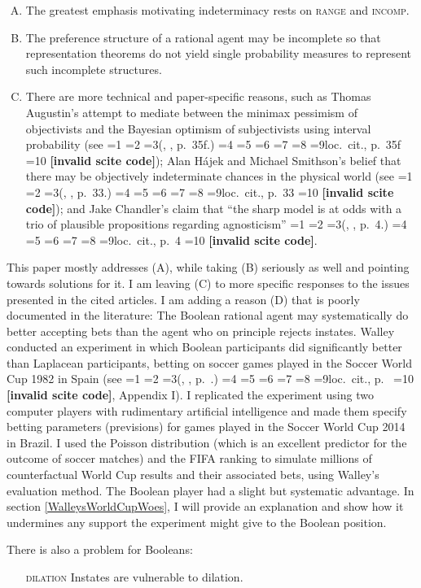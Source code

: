 \documentclass[journal]{IEEEtran}
\newcommand{\qeins}[1]{``#1''}
\newcommand{\fcut}[1]{}
\newif\ifNumericalOrYear
\newcommand{\PageP}{p.~}
\newcommand{\PageP}{}
\newcommand{\scite}[3]{\ifnum#1=1\ifNumericalOrYear\citep{#2}\else\citeyearpar{#2}\fi\else
\ifnum#1=2\ifNumericalOrYear\citep[#3]{#2}\else\citep[{\PageP}#3]{#2}\fi\else
\ifnum#1=3\ifNumericalOrYear(\citet[#3]{#2})\else(\citeauthor{#2}, \citeyear{#2}, {\PageP}#3.)\fi\else
\ifnum#1=4\ifNumericalOrYear\citet{#2}\else\citet{#2}\fi\else
\ifnum#1=5\ifNumericalOrYear(\citet{#2})\else\citep{#2}\fi\else
\ifnum#1=6\ifNumericalOrYear(\citet[#3]{#2})\else\citep[{\PageP}#3]{#2}\fi\else
\ifnum#1=7\ifNumericalOrYear\citep{#2}\else\citealp{#2}\fi\else
\ifnum#1=8\ifNumericalOrYear\citep[#3]{#2}\else\citealp[{\PageP}#3]{#2}\fi\else
\ifnum#1=9\ifNumericalOrYear\citep[#3]{#2}\else{}loc.\ cit., {\PageP}#3\fi\else
\ifnum#1=10\ifNumericalOrYear\citep{#2}\else\citeyear{#2}\fi\else
\textbf{[invalid scite code]}\fi\fi\fi\fi\fi\fi\fi\fi\fi\fi}
\begin{document}
\begin{enumerate}[(A)]
\item The greatest emphasis motivating indeterminacy rests on
  \textsc{range} and \textsc{incomp}.
\item The preference structure of a rational agent may be incomplete
  so that representation theorems do not yield single probability
  measures to represent such incomplete structures.
\item There are more technical and paper-specific reasons, such as
  Thomas Augustin's attempt to mediate between the minimax pessimism
  of objectivists and the Bayesian optimism of subjectivists using
  interval probability (see \scite{8}{augustin03}{35f}); Alan
  H{\'a}jek and Michael Smithson's belief that there may be
  objectively indeterminate chances in the physical world (see
  \scite{8}{hajeksmithson12}{33}); and Jake Chandler's claim that
  \qeins{the sharp model is at odds with a trio of plausible
    propositions regarding agnosticism} \scite{2}{chandler14}{4}.
\end{enumerate}

This paper mostly addresses (A), while taking (B) seriously as well
and pointing towards solutions for it. I am leaving (C) to more
specific responses to the issues presented in the cited articles. I am
adding a reason (D) that is poorly documented in the literature: The
Boolean rational agent may systematically do better accepting bets
than the agent who on principle rejects instates.  Walley conducted an
experiment in which Boolean participants did significantly better than
Laplacean participants, betting on soccer games played in the Soccer
World Cup 1982 in Spain (see \scite{7}{walley91}{}, Appendix I). I
replicated the experiment using two computer players with rudimentary
artificial intelligence and made them specify betting parameters
(previsions) for games played in the Soccer World Cup 2014 in Brazil.
I used the Poisson distribution (which is an excellent predictor for
the outcome of soccer matches) and the FIFA ranking to simulate
millions of counterfactual World Cup results and their associated
bets, using Walley's evaluation method.  The Boolean player had a
slight but systematic advantage. In section \ref{WalleysWorldCupWoes},
I will provide an explanation and show how it undermines any support
the experiment might give to the Boolean position.\fcut{5}

There is also a problem for Booleans:

\begin{itemize}
\item [\textsc{dilation}] Instates are vulnerable to dilation.
\end{itemize}
\end{document}
